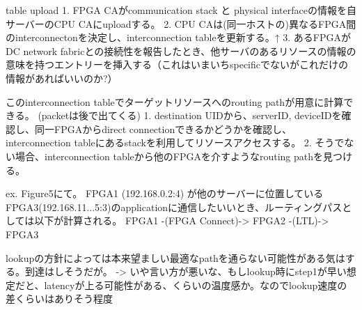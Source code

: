 \documentclass[dvipdfmx,9pt,notheorems]{beamer}
\theoremstyle{definition}
\begin{document}
\begin{frame}
{  table upload
  1. FPGA CAがcommunication stack と physical interfaceの情報を自サーバーのCPU CAにuploadする。
  2. CPU CAは(同一ホストの)異なるFPGA間のinterconnectonを決定し、interconnection tableを更新する。↑
  3. あるFPGAがDC network fabricとの接続性を報告したとき、他サーバのあるリソースの情報の意味を持つエントリーを挿入する（これはいまいちspecificでないがこれだけの情報があればいいのか?）
  
  このinterconnection tableでターゲットリソースへのrouting pathが用意に計算できる。 (packetは後で出てくる)
  1. destination UIDから、serverID, deviceIDを確認し、同一FPGAからdirect connectionできるかどうかを確認し、interconnection tableにあるstackを利用してリソースアクセスする。
  2. そうでない場合、interconnection tableから他のFPGAを介すようなrouting pathを見つける。
  
  ex.  Figure5にて。
  FPGA1 (192.168.0.2:4) が他のサーバーに位置しているFPGA3(192.168.11...5:3)のapplicationに通信したいいとき、ルーティングパスとしては以下が計算される。
  FPGA1 -(FPGA Connect)-> FPGA2 -(LTL)-> FPGA3
  
  lookupの方針によっては本来望ましい最適なpathを通らない可能性がある気はする。到達はしそうだが。
  -> いや言い方が悪いな、もしlookup時にstep1が早い想定だと、latencyが上る可能性がある、くらいの温度感か。なのでlookup速度の差くらいはありそう程度
}
\end{frame}
\end{document}
